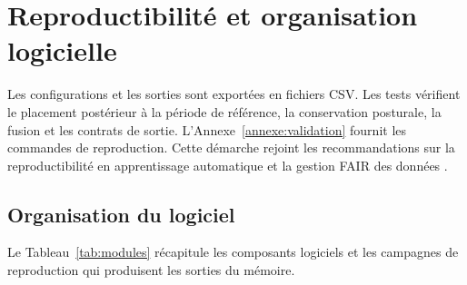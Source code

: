 \section{Reproductibilité et organisation logicielle}
Les configurations et les sorties sont exportées en fichiers CSV. Les tests vérifient le placement
postérieur à la période de référence, la conservation posturale, la fusion et les contrats
de sortie. L'Annexe~\ref{annexe:validation} fournit les commandes de reproduction. Cette
démarche rejoint les recommandations sur la reproductibilité en apprentissage automatique et
la gestion FAIR des données \citep{pineau2021improving,wilkinson2016fair}.

\subsection{Organisation du logiciel}
Le Tableau~\ref{tab:modules} récapitule les composants logiciels et les campagnes de
reproduction qui produisent les sorties du mémoire.

